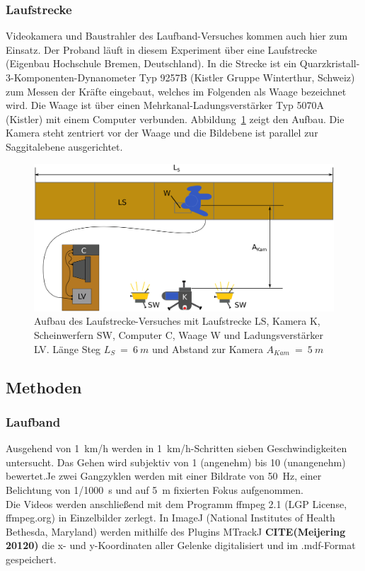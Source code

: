 \subsubsection{Laufstrecke}
Videokamera und Baustrahler des Laufband-Versuches kommen auch hier zum Einsatz. Der Proband läuft in diesem Experiment über eine Laufstrecke (Eigenbau Hochschule Bremen, Deutschland). In die Strecke ist ein Quarzkristall-3-Komponenten-Dynanometer Typ 9257B (Kistler Gruppe Winterthur, Schweiz) zum Messen der Kräfte eingebaut, welches im Folgenden als Waage bezeichnet wird. Die Waage ist über einen Mehrkanal-Ladungsverstärker Typ 5070A (Kistler) mit einem Computer verbunden. Abbildung~\ref{fig:laufstg_stp} zeigt den Aufbau. Die Kamera steht zentriert vor der Waage und die Bildebene ist parallel zur Saggitalebene ausgerichtet.
\begin{figure}[h!]
	\centering
	\includegraphics[width=0.7\linewidth]{bilder/mat_met/Laufstrecke_setup}
	\caption[Aufbau Laufstrecke Versuch]{Aufbau des Laufstrecke-Versuches mit Laufstrecke LS, Kamera K, Scheinwerfern SW, Computer C, Waage W und Ladungsverstärker LV. Länge Steg $L_S~=~6~m$ und Abstand zur Kamera $A_{Kam}~=~5~m$}
	\label{fig:laufstg_stp}
\end{figure}

\subsection{Methoden}
\subsubsection{Laufband}
Ausgehend von 1~km/h werden in 1~km/h-Schritten sieben Geschwindigkeiten untersucht. Das Gehen wird subjektiv von 1 (angenehm) bis 10 (unangenehm) bewertet.Je zwei Gangzyklen werden mit einer Bildrate von 50~Hz, einer Belichtung von 1/1000~s und auf 5~m fixierten Fokus aufgenommen.\\
Die Videos werden anschließend mit dem Programm ffmpeg 2.1 (LGP License, ffmpeg.org) in Einzelbilder zerlegt. In ImageJ (National Institutes of Health Bethesda, Maryland) werden mithilfe des Plugins MTrackJ \textbf{CITE(Meijering 20120)} die x- und y-Koordinaten aller Gelenke digitalisiert und im .mdf-Format gespeichert.

